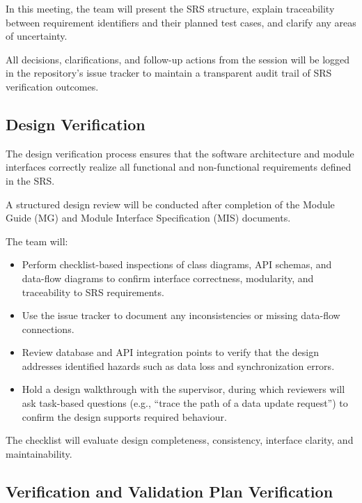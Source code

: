 \documentclass[12pt, titlepage]{article}
\begin{document}
In this meeting, the team will present the SRS structure, explain traceability
between requirement identifiers and their planned test cases, and clarify any
areas of uncertainty.

All decisions, clarifications, and follow-up actions from the session will be
logged in the repository’s issue tracker to maintain a transparent audit trail
of SRS verification outcomes.

\subsection{Design Verification}
\label{subsec:design-verification}
The design verification process ensures that the software architecture and
module interfaces correctly realize all functional and non-functional
requirements defined in the SRS.

A structured design review will be conducted after completion of the Module
Guide (MG) and Module Interface Specification (MIS) documents.

The team will:

\begin{itemize}
  \item Perform checklist-based inspections of class diagrams, API schemas, and
  data-flow diagrams to confirm interface correctness, modularity, and
  traceability to SRS requirements.

  \item Use the issue tracker to document any inconsistencies or missing
  data-flow connections.

  \item Review database and API integration points to verify that the design
  addresses identified hazards such as data loss and synchronization errors.

  \item Hold a design walkthrough with the supervisor, during which reviewers
  will ask task-based questions (e.g., ``trace the path of a data update
  request'') to confirm the design supports required behaviour.
\end{itemize}

The checklist will evaluate design completeness, consistency, interface
clarity, and maintainability.

\subsection{Verification and Validation Plan Verification}
\label{subsec:vnv-plan-verification}
\end{document}
